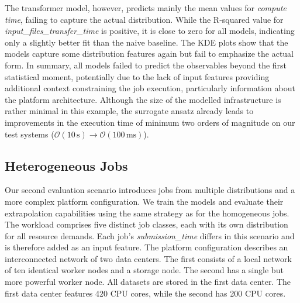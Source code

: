 %
The transformer model, however, predicts mainly the mean values for \textit{compute time}, failing to capture the actual distribution. 
%
While the R-squared value for \textit{input\_files\_transfer\_time} is positive, it is close to zero for all models, indicating only a slightly better fit than the naive baseline. 
%
The KDE plots show that the models capture some distribution features again but fail to emphasize the actual form. 
%
In summary, all models failed to predict the observables beyond the first statistical moment, potentially due to the lack of input features providing additional context constraining the job execution, particularly information about the platform architecture.
%
Although the size of the modelled infrastructure is rather minimal in this example, the surrogate ansatz already leads to improvements in the execution time of minimum two orders of magnitude on our test systems ($\mathcal{O}(10\,\mathrm{s}) \to \mathcal{O}(100\,\mathrm{ms})$).


\subsection{Heterogeneous Jobs} \label{sec:eval:heterogeneous}

Our second evaluation scenario introduces jobs from multiple distributions and a more complex platform configuration.
%
We train the models and evaluate their extrapolation capabilities using the same strategy as for the homogeneous jobs.
%
The workload comprises five distinct job classes, each with its own distribution for all resource demands.
Each job's \textit{submission\_time} differs in this scenario and is therefore added as an input feature.
%
The platform configuration describes an interconnected network of two data centers. 
%
The first consists of a local network of ten identical worker nodes and a storage node. 
%
The second has a single but more powerful worker node. 
%
All datasets are stored in the first data center. 
%
The first data center features 420 CPU cores, while the second has 200 CPU cores.
%


